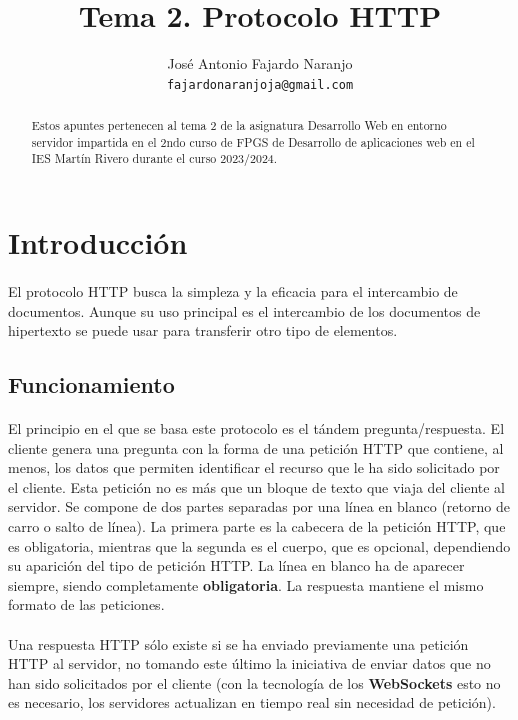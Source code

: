 \documentclass{article}
\title{Tema 2. Protocolo HTTP}
\author{José Antonio Fajardo Naranjo \\
	\small
	\tt{fajardonaranjoja@gmail.com} \\
	\date{}
}
\begin{document}
	\maketitle
	\begin{abstract} 
		\noindent Estos apuntes pertenecen al tema 2 de la asignatura Desarrollo Web en entorno servidor impartida en el 2ndo curso de FPGS de Desarrollo de aplicaciones web en el IES Martín Rivero durante el curso 2023/2024.
	\end{abstract}
	\newpage{\ }
	\tableofcontents
	\newpage{\ }
	\thispagestyle{empty}
	
	


	\section{Introducción}
	
	\paragraph{}El protocolo HTTP busca la simpleza y la eficacia para el intercambio de documentos. Aunque su uso principal es el intercambio de los documentos de hipertexto se puede usar para transferir otro tipo de elementos.
	
	\subsection{Funcionamiento}
	
	\paragraph{}El principio en el que se basa este protocolo es el tándem pregunta/respuesta. El cliente genera una pregunta con la forma de una petición HTTP que contiene, al menos, los datos que permiten identificar el recurso que le ha sido solicitado por el cliente. Esta petición no es más que un bloque de texto que viaja del cliente al servidor. Se compone de dos partes separadas por una línea en blanco (retorno de carro o salto de línea). La primera parte es la cabecera de la petición HTTP, que es obligatoria, mientras que la segunda es el cuerpo, que es opcional, dependiendo su aparición del tipo de petición HTTP. La línea en blanco ha de aparecer siempre, siendo completamente \textbf{obligatoria}. La respuesta mantiene el mismo formato de las peticiones.
	
	\paragraph{}Una respuesta HTTP sólo existe si se ha enviado previamente una petición HTTP al servidor, no tomando este último la iniciativa de enviar datos que no han sido solicitados por el cliente (con la tecnología de los \textbf{WebSockets} esto no es necesario, los servidores actualizan en tiempo real sin necesidad de petición).
	
\end{document}
